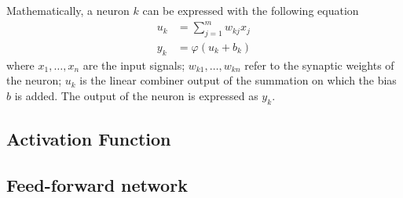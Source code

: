 Mathematically, a neuron $k$ can be expressed with the following equation \cite{Haykin:1998:NNC:521706}
\begin{eqnarray}
  u_k &= \sum_{j = 1}^{m}w_{kj}x_{j} \\
  y_k &= \varphi(u_k + b_k)
\end{eqnarray}
where $x_1, \dots, x_n$ are the input signals; $w_{k1}, \dots, w_{kn}$ refer to the synaptic weights of the neuron; $u_k$ is the linear combiner output of the summation on which the bias $b$ is added. The output of the neuron is expressed as $y_k$.

\subsection{Activation Function}
\subsection{Feed-forward network}

